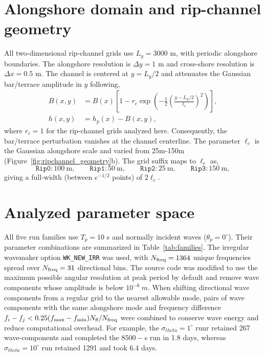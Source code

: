 \documentclass[11pt]{article}
\begin{document}
\section{Alongshore domain and rip-channel geometry}
All two-dimensional rip-channel grids use $L_y=3000$ m, with periodic
alongshore boundaries. The alongshore resolution is $\Delta y=1$ m and
cross-shore resolution is $\Delta x = 0.5$ m. The channel is centered at $y=L_y/2$ and
attenuates the Gaussian bar/terrace amplitude in $y$ following,
\begin{align}
 B(x,y) &= B(x)\left[1-r_c\exp\left(-\frac{1}{2}\left(\frac{y-L_y/2}{\ell_c}\right)^2\right)\right],\\
 h(x,y) &= h_p(x)-B(x,y),
\end{align}
where $r_c=1$ for the rip-channel grids analyzed here. Consequently,
the bar/terrace perturbation vanishes at the channel centerline.  The
parameter $\ell_c$ is the Gaussian alongshore scale and varied from
25m-150m (Figure~\ref{fig:ripchannel_geometry}b). The grid suffix maps to $\ell_c$ as,
\begin{equation}
\texttt{Rip0}:100~\mathrm{m},\qquad
\texttt{Rip1}:50~\mathrm{m},\qquad
\texttt{Rip2}:25~\mathrm{m},\qquad
\texttt{Rip3}:150~\mathrm{m},
\end{equation}
giving a full-width (between $e^{-1/2}$ points) of $2\ell_c$.

\section{Analyzed parameter space}
All five run families use $T_p=10$ s and normally incident waves
($\theta_p=0^\circ$).  Their parameter combinations are summarized in
Table~\ref{tab:families}.  The irregular wavemaker option
\texttt{WK\_NEW\_IRR} was used, with $N_{\rm freq}=1364$ unique
frequencies spread over $N_{\rm freq}=31$ directional bins. The source
code was modified to use the maximum possible angular resolution at
peak period by default and remove wave components whose amplitude is
below $10^{-6}~\unit{m}$. When shifting directional wave components
from a regular grid to the nearest allowable mode, pairs of wave
components with the same alongshore mode and frequency difference
$f_i-f_j<0.25(f_{\rm max}-f_{\rm min}) N_{\rm \theta}/N_{\rm freq}$
were combined to conserve wave energy and reduce computational
overhead. For example, the $\sigma_{theta}=1^\circ$ runr retained 267
wave-components and completed the $8500-$s run in 1.8 days, whereas
$\sigma_{theta}=10^\circ$ run retained 1291 and took 6.4 days.
\end{document}
